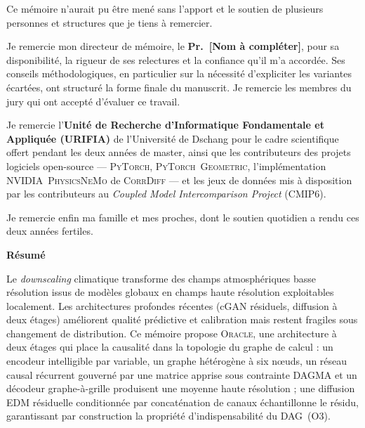 \documentclass[14pt,a4paper,openany]{extreport}
\newcommand{\Oracle}{\textsc{Oracle}}
\begin{document}
Ce mémoire n'aurait pu être mené sans l'apport et le soutien de plusieurs personnes et structures que je tiens à remercier.

Je remercie mon directeur de mémoire, le \textbf{Pr.~[Nom à compléter]}, pour sa disponibilité, la rigueur de ses relectures et la confiance qu'il m'a accordée. Ses conseils méthodologiques, en particulier sur la nécessité d'expliciter les variantes écartées, ont structuré la forme finale du manuscrit. Je remercie les membres du jury qui ont accepté d'évaluer ce travail.

Je remercie l'\textbf{Unité de Recherche d'Informatique Fondamentale et Appliquée (URIFIA)} de l'Université de Dschang pour le cadre scientifique offert pendant les deux années de master, ainsi que les contributeurs des projets logiciels open-source --- \textsc{PyTorch}, \textsc{PyTorch~Geometric}, l'implémentation \textsc{NVIDIA~PhysicsNeMo} de \textsc{CorrDiff} --- et les jeux de données mis à disposition par les contributeurs au \emph{Coupled Model Intercomparison Project} (CMIP6).

Je remercie enfin ma famille et mes proches, dont le soutien quotidien a rendu ces deux années fertiles.

\clearpage
\thispagestyle{plain}

\begingroup
\small
\setlength{\parskip}{0.3em}

\begin{center}{\large\bfseries\color{uridarkblue}Résumé}\end{center}

Le \emph{downscaling} climatique transforme des champs atmosphériques basse résolution issus de modèles globaux en champs haute résolution exploitables localement. Les architectures profondes récentes (cGAN résiduels, diffusion à deux étages) améliorent qualité prédictive et calibration mais restent fragiles sous changement de distribution. Ce mémoire propose \Oracle{}, une architecture à deux étages qui place la causalité dans la topologie du graphe de calcul : un encodeur intelligible par variable, un graphe hétérogène à six nœuds, un réseau causal récurrent gouverné par une matrice apprise sous contrainte DAGMA et un décodeur graphe-à-grille produisent une moyenne haute résolution ; une diffusion EDM résiduelle conditionnée par concaténation de canaux échantillonne le résidu, garantissant par construction la propriété d'indispensabilité du DAG~(O3).
\end{document}
